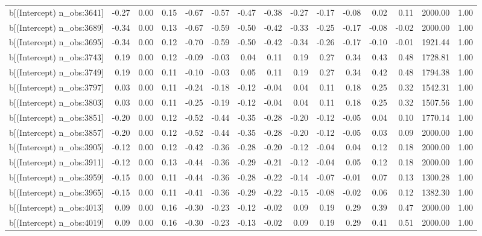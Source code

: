 \begin{table}[ht]
\begin{tabular}{rrrrrrrrrrrrrrr}
  b[(Intercept) n\_obs:3641] & -0.27 & 0.00 & 0.15 & -0.67 & -0.57 & -0.47 & -0.38 & -0.27 & -0.17 & -0.08 & 0.02 & 0.11 & 2000.00 & 1.00 \\ 
  b[(Intercept) n\_obs:3689] & -0.34 & 0.00 & 0.13 & -0.67 & -0.59 & -0.50 & -0.42 & -0.33 & -0.25 & -0.17 & -0.08 & -0.02 & 2000.00 & 1.00 \\ 
  b[(Intercept) n\_obs:3695] & -0.34 & 0.00 & 0.12 & -0.70 & -0.59 & -0.50 & -0.42 & -0.34 & -0.26 & -0.17 & -0.10 & -0.01 & 1921.44 & 1.00 \\ 
  b[(Intercept) n\_obs:3743] & 0.19 & 0.00 & 0.12 & -0.09 & -0.03 & 0.04 & 0.11 & 0.19 & 0.27 & 0.34 & 0.43 & 0.48 & 1728.81 & 1.00 \\ 
  b[(Intercept) n\_obs:3749] & 0.19 & 0.00 & 0.11 & -0.10 & -0.03 & 0.05 & 0.11 & 0.19 & 0.27 & 0.34 & 0.42 & 0.48 & 1794.38 & 1.00 \\ 
  b[(Intercept) n\_obs:3797] & 0.03 & 0.00 & 0.11 & -0.24 & -0.18 & -0.12 & -0.04 & 0.04 & 0.11 & 0.18 & 0.25 & 0.32 & 1542.31 & 1.00 \\ 
  b[(Intercept) n\_obs:3803] & 0.03 & 0.00 & 0.11 & -0.25 & -0.19 & -0.12 & -0.04 & 0.04 & 0.11 & 0.18 & 0.25 & 0.32 & 1507.56 & 1.00 \\ 
  b[(Intercept) n\_obs:3851] & -0.20 & 0.00 & 0.12 & -0.52 & -0.44 & -0.35 & -0.28 & -0.20 & -0.12 & -0.05 & 0.04 & 0.10 & 1770.14 & 1.00 \\ 
  b[(Intercept) n\_obs:3857] & -0.20 & 0.00 & 0.12 & -0.52 & -0.44 & -0.35 & -0.28 & -0.20 & -0.12 & -0.05 & 0.03 & 0.09 & 2000.00 & 1.00 \\ 
  b[(Intercept) n\_obs:3905] & -0.12 & 0.00 & 0.12 & -0.42 & -0.36 & -0.28 & -0.20 & -0.12 & -0.04 & 0.04 & 0.12 & 0.18 & 2000.00 & 1.00 \\ 
  b[(Intercept) n\_obs:3911] & -0.12 & 0.00 & 0.13 & -0.44 & -0.36 & -0.29 & -0.21 & -0.12 & -0.04 & 0.05 & 0.12 & 0.18 & 2000.00 & 1.00 \\ 
  b[(Intercept) n\_obs:3959] & -0.15 & 0.00 & 0.11 & -0.44 & -0.36 & -0.28 & -0.22 & -0.14 & -0.07 & -0.01 & 0.07 & 0.13 & 1300.28 & 1.00 \\ 
  b[(Intercept) n\_obs:3965] & -0.15 & 0.00 & 0.11 & -0.41 & -0.36 & -0.29 & -0.22 & -0.15 & -0.08 & -0.02 & 0.06 & 0.12 & 1382.30 & 1.00 \\ 
  b[(Intercept) n\_obs:4013] & 0.09 & 0.00 & 0.16 & -0.30 & -0.23 & -0.12 & -0.02 & 0.09 & 0.19 & 0.29 & 0.39 & 0.47 & 2000.00 & 1.00 \\ 
  b[(Intercept) n\_obs:4019] & 0.09 & 0.00 & 0.16 & -0.30 & -0.23 & -0.13 & -0.02 & 0.09 & 0.19 & 0.29 & 0.41 & 0.51 & 2000.00 & 1.00 \\ 

\end{tabular}
\end{table}
